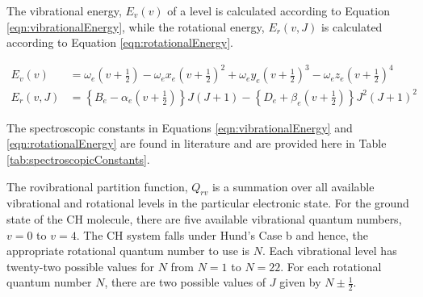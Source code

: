 The vibrational energy, \(E_v(v)\) of a level is calculated according to Equation \ref{eqn:vibrationalEnergy}, while the rotational energy, \(E_r(v, J)\) is calculated according to Equation \ref{eqn:rotationalEnergy}.

\begin{align}
  E_v(v) &= \omega_e \left(v+\frac{1}{2}\right) - \omega_ex_e \left(v+\frac{1}{2}\right)^2 + \omega_ey_e \left(v+\frac{1}{2}\right)^3 - \omega_ez_e \left(v+\frac{1}{2}\right)^4
  \label{eqn:vibrationalEnergy}\\
  E_r(v, J) &= \left\{B_e - \alpha_e \left(v+\frac{1}{2}\right)\right\}J(J+1) - \left\{D_e + \beta_e \left(v+\frac{1}{2}\right)\right\}J^2(J+1)^2
  \label{eqn:rotationalEnergy}
\end{align}

The spectroscopic constants in Equations \ref{eqn:vibrationalEnergy} and \ref{eqn:rotationalEnergy} are found in literature\cite{1995-zachwieja} and are provided here in Table \ref{tab:spectroscopicConstants}.



The rovibrational partition function, \(Q_{rv}\) is a summation over all available vibrational and rotational levels in the particular electronic state.
For the ground state of the CH molecule, there are five available vibrational quantum numbers, \(v = 0\) to \(v = 4\).
The CH system falls under Hund's Case b and hence, the appropriate rotational quantum number to use is \(N\).
Each vibrational level has twenty-two possible values for \(N\) from \(N = 1\) to \(N = 22\).
For each rotational quantum number \(N\), there are two possible values of \(J\) given by \(N \pm \frac{1}{2}\).

